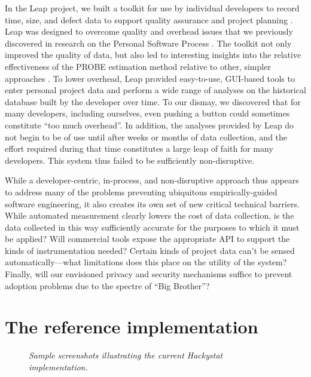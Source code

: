 In the Leap project, we built a toolkit for use by individual developers to
record time, size, and defect data to support quality assurance and project
planning \cite{csdl-99-08,csdl-99-15}.  Leap was designed to overcome
quality and overhead issues that we previously discovered in research on
the Personal Software Process \cite{csdl-98-13}. The toolkit not only
improved the quality of data, but also led to interesting insights into the
relative effectiveness of the PROBE estimation method relative to other,
simpler approaches \cite{csdl2-00-03}.  To lower overhead, Leap provided
easy-to-use, GUI-based tools to enter personal project data and perform a
wide range of analyses on the historical database built by the developer
over time. To our dismay, we discovered that for many developers, including
ourselves, even pushing a button could sometimes constitute ``too much overhead''. In
addition, the analyses provided by Leap do not begin to be of use until
after weeks or months of data collection, and the effort required during
that time constitutes a large leap of faith for many developers.  This system
thus failed to be sufficiently non-disruptive.
 
While a developer-centric, in-process, and non-disruptive approach thus
appears to address many of the problems preventing ubiquitous
empirically-guided software engineering, it also creates its own set of new
critical technical barriers.  While automated measurement clearly lowers
the cost of data collection, is the data collected in this way sufficiently
accurate for the purposes to which it must be applied? Will commercial
tools expose the appropriate API to support the kinds of instrumentation
needed?  Certain kinds of project data can't be sensed automatically---what
limitations does this place on the utility of the system? Finally, will our
envisioned privacy and security mechanisms suffice to prevent adoption
problems due to the spectre of ``Big Brother''?


\section*{The reference implementation}

\begin{figure}[t]
 {\centerline {}}
 \caption{{\em Sample screenshots illustrating the current Hackystat
 implementation. }}
 \label{fig:screenshots}
\end{figure}

